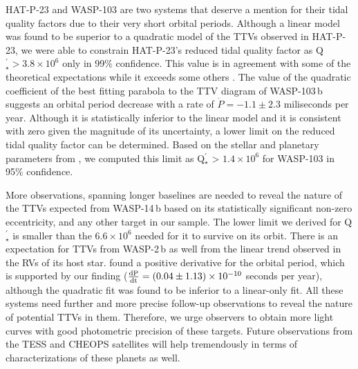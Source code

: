 \documentclass[a4paper,fleqn,usenatbib]{mnras}
\begin{document}
HAT-P-23 and WASP-103 are two systems that deserve a mention for their tidal quality factors due to their very short orbital periods. Although a linear model was found to be superior to a quadratic model of the TTVs observed in HAT-P-23, we were able to constrain HAT-P-23's reduced tidal quality factor as Q$_{\star}^{\prime} > 3.8 \times 10^6$ only in 99\% confidence. This value is in agreement with some of the theoretical expectations \citep{2011ApJ...731...67P,2012ApJ...751...96P,2014ARA&A..52..171O, 2019AJ....158..190H} while it exceeds some others \citep{2008ApJ...678.1396J,2016APS..APR.L1022E}. The value of the quadratic coefficient of the best fitting parabola to the TTV diagram of WASP-103\,b suggests an orbital period decrease with a rate of $\dot{P} = -1.1 \pm 2.3$ miliseconds per year. Although it is statistically inferior to the linear model and it is consistent with zero given the magnitude of its uncertainty, a lower limit on the reduced tidal quality factor can be determined. Based on the stellar and planetary parameters from \cite{2014A&A...562L...3G}, we computed this limit as  Q$^{\prime}_{\star}$ > $1.4 \times 10^6$ for WASP-103 in 95\% confidence.

More observations, spanning longer baselines are needed to reveal the nature of the TTVs expected from WASP-14\,b \citep{2019MNRAS.485.5168M} based on its statistically significant non-zero eccentricity, and any other target in our sample. The lower limit we derived for Q$^{\prime}_{\star}$ is smaller than the $6.6 \times 10^6$ needed for it to survive on its orbit. There is an expectation for TTVs from WASP-2\,b as well from the linear trend observed in the RVs of its host star. \cite{2019MNRAS.490.1294B} found a positive derivative for the orbital period, which is supported by our finding ($\frac{\rm dP}{\rm dt} = (0.04 \pm 1.13) \times 10^{-10}$ seconds per year), although the quadratic fit was found to be inferior to a linear-only fit. All these systems need further and more precise follow-up observations to reveal the nature of potential TTVs in them. Therefore, we urge observers to obtain more light curves with good photometric precision of these targets. Future observations from the TESS and CHEOPS satellites will help tremendously in terms of characterizations of these planets as well.
\end{document}
